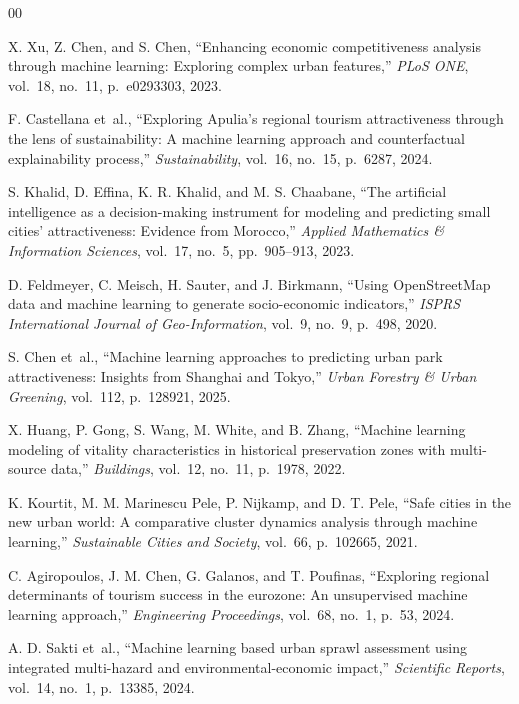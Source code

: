 \documentclass[conference]{IEEEtran}
\begin{document}
\begin{thebibliography}{00}

X. Xu, Z. Chen, and S. Chen,
``Enhancing economic competitiveness analysis through machine learning:
Exploring complex urban features,''
\textit{PLoS ONE}, vol.~18, no.~11, p.~e0293303, 2023.

F. Castellana et~al.,
``Exploring Apulia's regional tourism attractiveness through the lens of
sustainability: A machine learning approach and counterfactual explainability process,''
\textit{Sustainability}, vol.~16, no.~15, p.~6287, 2024.

S. Khalid, D. Effina, K. R. Khalid, and M. S. Chaabane,
``The artificial intelligence as a decision-making instrument for modeling
and predicting small cities' attractiveness: Evidence from Morocco,''
\textit{Applied Mathematics \& Information Sciences}, vol.~17, no.~5,
pp.~905--913, 2023.

D. Feldmeyer, C. Meisch, H. Sauter, and J. Birkmann,
``Using OpenStreetMap data and machine learning to generate socio-economic indicators,''
\textit{ISPRS International Journal of Geo-Information},
vol.~9, no.~9, p.~498, 2020.

S. Chen et~al.,
``Machine learning approaches to predicting urban park attractiveness:
Insights from Shanghai and Tokyo,''
\textit{Urban Forestry \& Urban Greening}, vol.~112, p.~128921, 2025.

X. Huang, P. Gong, S. Wang, M. White, and B. Zhang,
``Machine learning modeling of vitality characteristics in historical
preservation zones with multi-source data,''
\textit{Buildings}, vol.~12, no.~11, p.~1978, 2022.

K. Kourtit, M. M. Marinescu Pele, P. Nijkamp, and D. T. Pele,
``Safe cities in the new urban world: A comparative cluster dynamics
analysis through machine learning,''
\textit{Sustainable Cities and Society}, vol.~66, p.~102665, 2021.

C. Agiropoulos, J. M. Chen, G. Galanos, and T. Poufinas,
``Exploring regional determinants of tourism success in the eurozone:
An unsupervised machine learning approach,''
\textit{Engineering Proceedings}, vol.~68, no.~1, p.~53, 2024.

A. D. Sakti et~al.,
``Machine learning based urban sprawl assessment using integrated
multi-hazard and environmental-economic impact,''
\textit{Scientific Reports}, vol.~14, no.~1, p.~13385, 2024.


\end{thebibliography}
\end{document}
